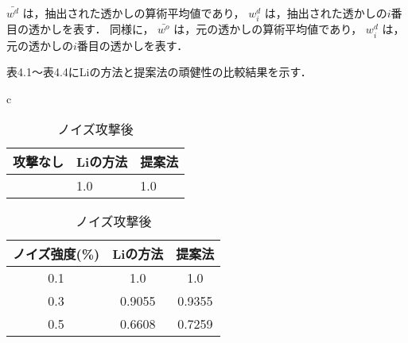 \documentclass[11pt]{jreport}
\begin{document}
{\begin{math}
\bar{w^d}
\end{math}
は，抽出された透かしの算術平均値であり，
\begin{math}
w_i^d
\end{math}
は，抽出された透かしの\begin{math}i\end{math}番目の透かしを表す．
同様に，
\begin{math}
\bar{w^o}
\end{math}
は，元の透かしの算術平均値であり，
\begin{math}
w_i^d
\end{math}
は，元の透かしの\begin{math}i\end{math}番目の透かしを表す．\par

表4.1～表4.4にLiの方法と提案法の頑健性の比較結果を示す．


\begin{table}[htbp]
  \begin{center}
    \begin{tabular}{c}

      \begin{minipage}{0.5\hsize}
        \begin{center}
          \caption{攻撃なし}
          \begin{tabular}{l|l|l}
          \hline
    攻撃なし & Liの方法 & 提案法\\ \hline \hline
                                \quad  & 1.0 & 1.0 \\ \hline
         
          \end{tabular}
        \end{center}
      \end{minipage}

      \begin{minipage}{0.5\hsize}
        \begin{center}
          \caption{ノイズ攻撃後}
          \begin{tabular}{c|c|c}
            \hline
            ノイズ強度(\%) & Liの方法 & 提案法 \\ \hline \hline
            0.1 & 1.0 & 1.0 \\
            0.3 & 0.9055 & 0.9355 \\
            0.5 & 0.6608 & 0.7259 \\ \hline
          \end{tabular}
        \end{center}
      \end{minipage}


\end{tabular}
\end{center}
\end{table}}
\end{document}

